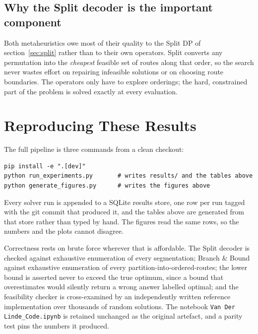 \documentclass[11pt,a4paper]{article}
\begin{document}
\subsection{Why the Split decoder is the important component}

Both metaheuristics owe most of their quality to the Split DP of
section~\ref{sec:split} rather than to their own operators. Split converts any
permutation into the \emph{cheapest} feasible set of routes along that order, so
the search never wastes effort on repairing infeasible solutions or on choosing
route boundaries. The operators only have to explore orderings; the hard,
constrained part of the problem is solved exactly at every evaluation.

\section{Reproducing These Results}

The full pipeline is three commands from a clean checkout:

\begin{verbatim}
pip install -e ".[dev]"
python run_experiments.py       # writes results/ and the tables above
python generate_figures.py      # writes the figures above
\end{verbatim}

Every solver run is appended to a SQLite results store, one row per run tagged
with the git commit that produced it, and the tables above are generated from
that store rather than typed by hand. The figures read the same rows, so the
numbers and the plots cannot disagree.

Correctness rests on brute force wherever that is affordable. The Split decoder
is checked against exhaustive enumeration of every segmentation; Branch \& Bound
against exhaustive enumeration of every partition-into-ordered-routes; the lower
bound is asserted never to exceed the true optimum, since a bound that
overestimates would silently return a wrong answer labelled optimal; and the
feasibility checker is cross-examined by an independently written reference
implementation over thousands of random solutions. The notebook
\texttt{Van Der Linde\_Code.ipynb} is retained unchanged as the original
artefact, and a parity test pins the numbers it produced.
\end{document}
